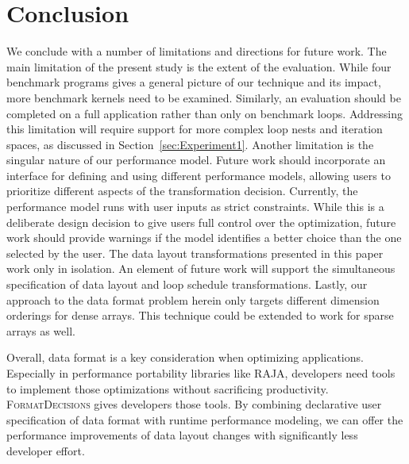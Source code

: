 \documentclass[sigconf,review=true]{acmart}
\newcommand{\FormatDecisions}[0]{{\textsc{FormatDecisions}}}
\begin{document}
\section{Conclusion}


We conclude with a number of limitations and directions for future work.
The main limitation of the present study is the extent of the evaluation.
While four benchmark programs gives a general picture of our technique and its impact, more benchmark kernels need to be examined.
Similarly, an evaluation should be completed on a full application rather than only on benchmark loops.
Addressing this limitation will require support for more complex loop nests and iteration spaces, as discussed in Section~\ref{sec:Experiment1}.
Another limitation is the singular nature of our performance model.
Future work should incorporate an interface for defining and using different performance models, allowing users to prioritize different aspects of the transformation decision.
Currently, the performance model runs with user inputs as strict constraints.
While this is a deliberate design decision to give users full control over the optimization, future work should provide warnings if the model identifies a better choice than the one selected by the user. 
The data layout transformations presented in this paper work only in isolation. 
An element of future work will support the simultaneous specification of data layout and loop schedule transformations. 
Lastly, our approach to the data format problem herein only targets different dimension orderings for dense arrays. 
This technique could be extended to work for sparse arrays as well. 

Overall, data format is a key consideration when optimizing applications.
Especially in performance portability libraries like RAJA, developers need tools to implement those optimizations without sacrificing productivity.
\FormatDecisions{} gives developers those tools.
By combining declarative user specification of data format with runtime performance modeling, we can offer the performance improvements of data layout changes with significantly less developer effort.
\balance



\end{document}
